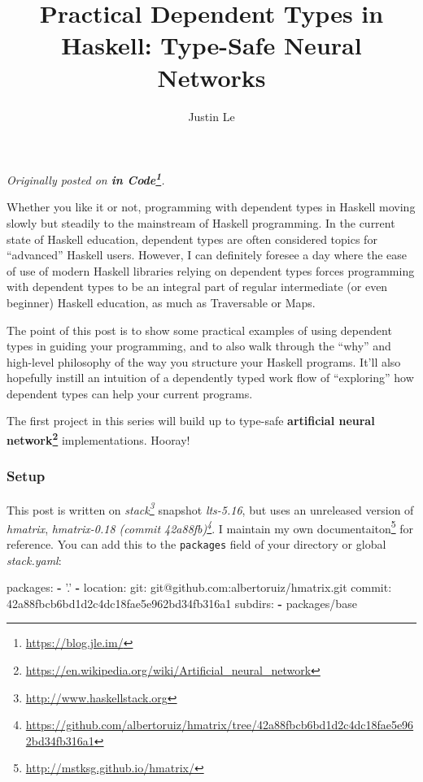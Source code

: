 \documentclass[]{article}
\title{Practical Dependent Types in Haskell: Type-Safe Neural Networks}
\author{Justin Le}
\newenvironment{Shaded}{}{}
\newcommand{\KeywordTok}[1]{\textcolor[rgb]{0.00,0.44,0.13}{\textbf{{#1}}}}
\newcommand{\StringTok}[1]{\textcolor[rgb]{0.25,0.44,0.63}{{#1}}}
\newcommand{\FunctionTok}[1]{\textcolor[rgb]{0.02,0.16,0.49}{{#1}}}
\newcommand{\NormalTok}[1]{{#1}}
\renewcommand{\href}[2]{#2\footnote{\url{#1}}}
\begin{document}
\maketitle

\emph{Originally posted on \textbf{\href{https://blog.jle.im/}{in
Code}}.}

Whether you like it or not, programming with dependent types in Haskell
moving slowly but steadily to the mainstream of Haskell programming. In
the current state of Haskell education, dependent types are often
considered topics for ``advanced'' Haskell users. However, I can
definitely foresee a day where the ease of use of modern Haskell
libraries relying on dependent types forces programming with dependent
types to be an integral part of regular intermediate (or even beginner)
Haskell education, as much as Traversable or Maps.

The point of this post is to show some practical examples of using
dependent types in guiding your programming, and to also walk through
the ``why'' and high-level philosophy of the way you structure your
Haskell programs. It'll also hopefully instill an intuition of a
dependently typed work flow of ``exploring'' how dependent types can
help your current programs.

The first project in this series will build up to type-safe
\textbf{\href{https://en.wikipedia.org/wiki/Artificial_neural_network}{artificial
neural network}} implementations. Hooray!

\subsubsection{Setup}\label{setup}

This post is written on \emph{\href{http://www.haskellstack.org}{stack}}
snapshot \emph{lts-5.16}, but uses an unreleased version of
\emph{hmatrix},
\emph{\href{https://github.com/albertoruiz/hmatrix/tree/42a88fbcb6bd1d2c4dc18fae5e962bd34fb316a1}{hmatrix-0.18
(commit 42a88fb)}}. I \href{http://mstksg.github.io/hmatrix/}{maintain
my own documentaiton} for reference. You can add this to the
\texttt{packages} field of your directory or global \emph{stack.yaml}:

\begin{Shaded}
\begin{Highlighting}[]
\FunctionTok{packages:}
\KeywordTok{-} \StringTok{'.'}
\KeywordTok{-} \FunctionTok{location:}
    \FunctionTok{git:} \NormalTok{git@github.com:albertoruiz/hmatrix.git}
    \FunctionTok{commit:} \NormalTok{42a88fbcb6bd1d2c4dc18fae5e962bd34fb316a1}
  \FunctionTok{subdirs:}
    \KeywordTok{-} \NormalTok{packages/base}
\end{Highlighting}
\end{Shaded}
\end{document}
